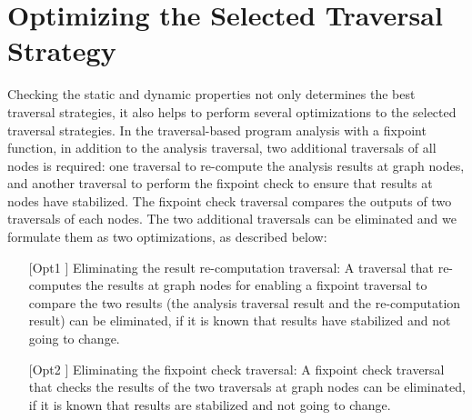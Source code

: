 \section{Optimizing the Selected Traversal Strategy}
\label{subsec:optimizations}
Checking the static and dynamic properties not only determines the best traversal strategies,
it also helps to perform several optimizations to the selected traversal strategies.
In the traversal-based program analysis with a fixpoint function, in addition to the analysis
traversal, two additional traversals of all nodes is required: one traversal to re-compute the
analysis results at graph nodes, and another traversal to perform the fixpoint check to ensure
that results at nodes have stabilized. The fixpoint check traversal compares the outputs
of two traversals of each nodes. The two additional traversals can be eliminated and we
formulate them as two optimizations, as described below:
\begin{itemize}
	\item [[Opt1]] Eliminating the result re-computation traversal: A traversal that re-computes the
results at graph nodes for enabling a fixpoint traversal to compare the two results (the
analysis traversal result and the re-computation result) can be eliminated, if it is known
that results have stabilized and not going to change.

\item [[Opt2]] Eliminating the fixpoint check traversal: A fixpoint check traversal that checks the
results of the two traversals at graph nodes can be eliminated, if it is known that results
are stabilized and not going to change.
\end{itemize}

